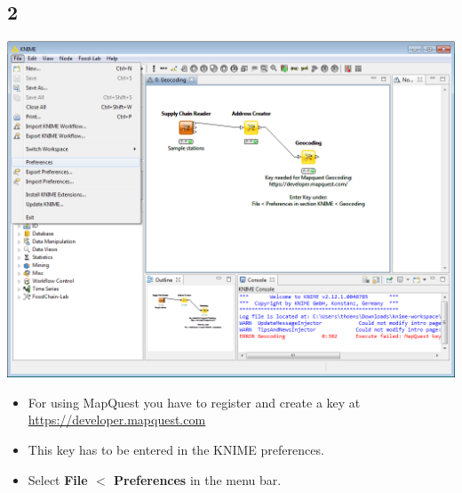 \documentclass{beamer}
\begin{document}
\subsection{2}
\begin{frame}
	\begin{center}
  		\includegraphics[height=0.6\textheight]{2.png}
	\end{center}
	\begin{itemize}		
		\item For using MapQuest you have to register and create a key at \url{https://developer.mapquest.com}
		\item This key has to be entered in the KNIME preferences.
		\item Select \textbf{File $<$ Preferences} in the menu bar.
	\end{itemize}
\end{frame}
\end{document}
